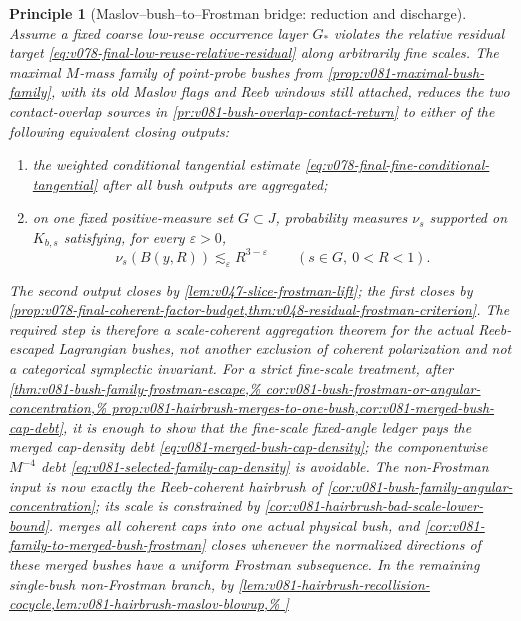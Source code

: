 \documentclass[10pt]{article}
\newtheorem{principle}[theorem]{Principle}
\begin{document}
\begin{principle}[Maslov--bush--to--Frostman bridge: reduction and discharge]
\label{prob:v081-maslov-bush-frostman-bridge}
Assume a fixed coarse low-reuse occurrence layer \(G_*\) violates the relative residual target
\eqref{eq:v078-final-low-reuse-relative-residual} along arbitrarily fine scales.  The maximal
\(M\)-mass family of point-probe bushes from \cref{prop:v081-maximal-bush-family}, with its old
Maslov flags and Reeb windows still attached, reduces the two contact-overlap sources in
\cref{pr:v081-bush-overlap-contact-return} to either of the following equivalent closing outputs:
\begin{enumerate}[label=\textnormal{(\roman*)}]
\item the weighted conditional tangential estimate
\eqref{eq:v078-final-fine-conditional-tangential} after all bush outputs are aggregated;
\item on one fixed positive-measure set \(G\subset J\), probability measures
\(\nu_s\) supported on \(K_{b,s}\) satisfying, for every \(\varepsilon>0\),
\[
\nu_s(B(y,R))
\lesssim_\varepsilon
R^{3-\varepsilon}
\qquad
(s\in G,\ 0<R<1).
\]
\end{enumerate}
The second output closes by
\cref{lem:v047-slice-frostman-lift}; the first closes by
\cref{prop:v078-final-coherent-factor-budget,thm:v048-residual-frostman-criterion}.
The required step is therefore a scale-coherent aggregation theorem for the actual
Reeb-escaped Lagrangian bushes, not another exclusion of coherent polarization and not a
categorical symplectic invariant.  For a strict fine-scale treatment, after
\cref{thm:v081-bush-family-frostman-escape,%
cor:v081-bush-frostman-or-angular-concentration,%
prop:v081-hairbrush-merges-to-one-bush,cor:v081-merged-bush-cap-debt}, it is enough to show that the
fine-scale fixed-angle ledger pays the merged cap-density debt
\eqref{eq:v081-merged-bush-cap-density}; the componentwise \(M^{-4}\) debt
\eqref{eq:v081-selected-family-cap-density} is avoidable.  The non-Frostman input is now exactly the
Reeb-coherent hairbrush of
\cref{cor:v081-bush-family-angular-concentration}; its scale is constrained by
\cref{cor:v081-hairbrush-bad-scale-lower-bound}.   merges all coherent caps into one actual physical
bush, and \cref{cor:v081-family-to-merged-bush-frostman} closes whenever the normalized directions
of these merged bushes have a uniform Frostman subsequence.  In the remaining single-bush
non-Frostman branch, by
\cref{lem:v081-hairbrush-recollision-cocycle,lem:v081-hairbrush-maslov-blowup,%
}
\end{principle}
\end{document}
